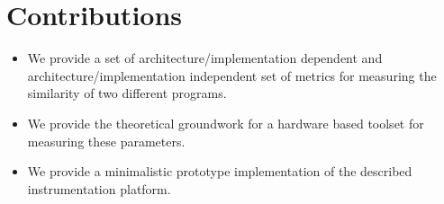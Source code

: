 \documentclass[../bachelor_paper.tex]{subfiles}
\begin{document}
\section{Contributions}
\begin{itemize}
\item We provide a set of architecture/implementation dependent and architecture/implementation independent set of metrics for measuring the similarity of two different programs.
\item We provide the theoretical groundwork for a hardware based toolset for measuring these parameters.
\item We provide a minimalistic prototype implementation of the described instrumentation platform.
\end{itemize}

\isstandalone



\fi
\end{document}
